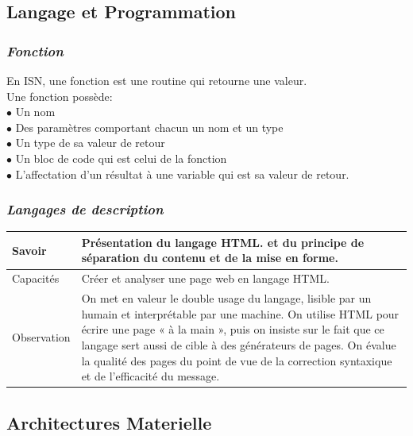 \documentclass[a4paper, 12pt]{article}
\begin{document}
\subsection{\textbf{Langage et Programmation}}
\subsubsection{\textit{Fonction}} 
En ISN, une fonction est une routine qui retourne une valeur.\\
Une fonction possède:\\
$\bullet$ Un nom\\
$\bullet$ Des paramètres comportant chacun un nom et un type\\
$\bullet$ Un type de sa valeur de retour\\
$\bullet$ Un bloc de code qui est celui de la fonction\\
$\bullet$ L'affectation d'un résultat à une variable qui est sa valeur de retour.

\subsubsection{\textit{Langages de description}}
\begin{center}
 \end{center}         
\begin{table}[!h]
\begin{tabular}{|l||p{12cm}|} \hline
Savoir & Présentation du langage HTML\cite{ISN3}. et du principe de séparation du contenu et de la mise en forme.\\ \hline \hline
Capacités & Créer et analyser une page web en langage HTML.\\ \hline \hline
Observation & On met en valeur le double usage du langage, lisible par un humain et interprétable par une machine. On utilise HTML pour écrire une page « à la main », puis on insiste sur le fait que ce langage sert aussi de cible à des générateurs de pages. On évalue la qualité des pages du point de vue de la correction syntaxique et de l'efficacité du message.\\ \hline
\end{tabular}
\end{table}
\subsection{\textbf{Architectures Materielle}}
\end{document}
